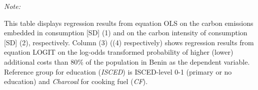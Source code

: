\begin{table}[htbp!]
\begin{adjustbox}{width = 1\textwidth, max height = 0.95\textheight, center}
\begin{threeparttable}[b]
         \begin{tablenotes}\item \medskip \textit{Note:}
            \item This table displays regression results from equation OLS on the carbon emissions embedded in consumption [SD] (1) and on the carbon intensity of consumption [SD] (2), respectively. 
                                      Column (3) ((4) respectively) shows regression results from equation LOGIT on the log-odds transformed probability of higher (lower) additional costs than 80\% of the population in Benin as the dependent variable. Reference group for education (\textit{ISCED}) is ISCED-level 0-1 (primary or no education) and \textit{Charcoal} for cooking fuel (\textit{CF}).
         \end{tablenotes}
      \end{threeparttable}
   \end{adjustbox}
\end{table}


